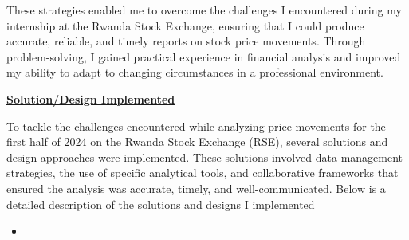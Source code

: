 \documentclass{article}
\begin{document}
\begin{titlepage}
\begin{titlepage}
\begin{flushleft}
\begin{flushleft}
These strategies enabled me to overcome the challenges I encountered during my internship at the Rwanda Stock Exchange, ensuring that I could produce accurate, reliable, and timely reports on stock price movements. Through problem-solving, I gained practical experience in financial analysis and improved my ability to adapt to changing circumstances in a professional environment.
\vspace{0.6cm}

\textbf{\underline{Solution/Design Implemented}}
\vspace{0.2cm}

To tackle the challenges encountered while analyzing price movements for the first half of 2024 on the Rwanda Stock Exchange (RSE), several solutions and design approaches were implemented. These solutions involved data management strategies, the use of specific analytical tools, and collaborative frameworks that ensured the analysis was accurate, timely, and well-communicated. Below is a detailed description of the solutions and designs I implemented
\vspace{0.3cm}
\begin{itemize}
    \item 


\end{itemize}
\end{flushleft}
\end{flushleft}
\end{titlepage}
\end{titlepage}
\end{document}
